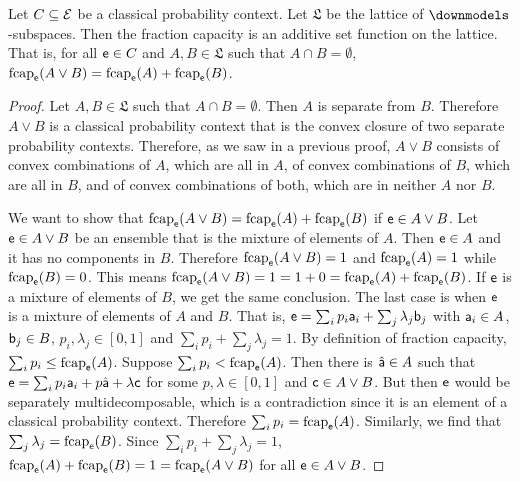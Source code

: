 \begin{mathSection}
\begin{prop}
	Let $C \subseteq \Ens$ be a classical probability context. Let $\mathfrak{L}$ be the lattice of $\separate$-subspaces. Then the fraction capacity is an additive set function on the lattice. That is, for all $\ens \in C$ and $A, B \in \mathfrak{L}$ such that $A \cap B = \emptyset$,  $\fcap_{\ens}(A \vee B) = \fcap_{\ens}(A) + \fcap_{\ens}(B)$.
\end{prop}

\begin{proof}
	Let $A, B\in \mathfrak{L}$ such that $A \cap B = \emptyset$. Then $A$ is separate from $B$. Therefore $A \vee B$ is a classical probability context that is the convex closure of two separate probability contexts. Therefore, as we saw in a previous proof, $A \vee B$ consists of convex combinations of $A$, which are all in $A$, of convex combinations of $B$, which are all in $B$, and of convex combinations of both, which are in neither $A$ nor $B$.
	
	We want to show that $\fcap_{\ens}(A \vee B) = \fcap_{\ens}(A) + \fcap_{\ens}(B)$ if $\ens \in A \vee B$. Let $\ens \in A \vee B$ be an ensemble that is the mixture of elements of $A$. Then $\ens \in A$ and it has no components in $B$. Therefore $\fcap_{\ens}(A \vee B) = 1$ and $\fcap_{\ens}(A) = 1$ while $\fcap_{\ens}(B) = 0$. This means $\fcap_{\ens}(A \vee B) = 1 = 1 + 0 = \fcap_{\ens}(A) + \fcap_{\ens}(B)$. If $\ens$ is a mixture of elements of $B$, we get the same conclusion. The last case is when $\ens$ is a mixture of elements of $A$ and $B$. That is, $\ens = \sum_i p_i \ens[a]_i + \sum_j \lambda_j \ens[b]_j$ with $\ens[a]_i \in A$, $\ens[b]_j \in B$, $p_i, \lambda_j \in [0,1]$ and $\sum_i p_i + \sum_j \lambda_j = 1$. By definition of fraction capacity, $\sum_i p_i \leq \fcap_{\ens}(A)$. Suppose $\sum_i p_i < \fcap_{\ens}(A)$. Then there is $\hat{\ens[a]} \in A$ such that $\ens = \sum_i p_i \ens[a]_i + p \hat{\ens[a]} + \lambda \ens[c]$ for some $p,\lambda \in [0,1]$ and $\ens[c] \in A \vee B$. But then $\ens$ would be separately multidecomposable, which is a contradiction since it is an element of a classical probability context. Therefore $\sum_i p_i = \fcap_{\ens}(A)$. Similarly, we find that $\sum_j \lambda_j = \fcap_{\ens}(B)$. Since $\sum_i p_i + \sum_j \lambda_j = 1$, $\fcap_{\ens}(A) + \fcap_{\ens}(B) = 1 = \fcap_{\ens}(A \vee B)$ for all $\ens \in A \vee B$.
	

\end{proof}
\end{mathSection}
